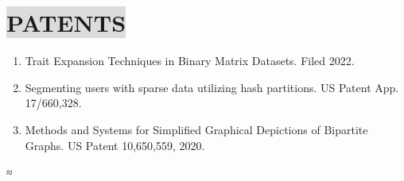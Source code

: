 \section*{
    \colorbox{gainsboro}{PATENTS}  
}

\begin{enumerate}[leftmargin=5mm]
    \item Trait Expansion Techniques in Binary Matrix Datasets. Filed 2022.
	\item Segmenting users with sparse data utilizing hash partitions. US Patent App. 17/660,328.
    \item Methods and Systems for Simplified Graphical Depictions of Bipartite Graphs. US Patent 10,650,559, 2020.
\end{enumerate}≈